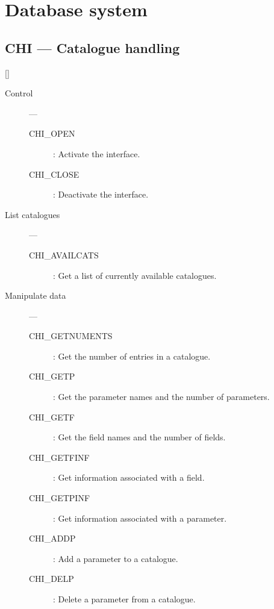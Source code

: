 \newpage

\section{Database system}

\subsection{CHI --- Catalogue handling}

\vspace{-9mm}

\hfill []

\vspace{2mm}

\begin{description}

\item [Control] ---

\begin{description}
\item [CHI\_OPEN] : Activate the interface.
\item [CHI\_CLOSE] : Deactivate the interface.
\end{description}
 
\item [List catalogues] ---

\begin{description}
\item [CHI\_AVAILCATS] :  Get a list of currently available catalogues.
\end{description}
 
\item [Manipulate data] ---

\begin{description}
\item [CHI\_GETNUMENTS] : Get the number of entries in a catalogue.
\item [CHI\_GETP] : Get the parameter names and the number of parameters.
\item [CHI\_GETF] : Get the field names and the number of fields.
\item [CHI\_GETFINF] : Get information associated with a field.
\item [CHI\_GETPINF] : Get information associated with a parameter.
\item [CHI\_ADDP] : Add a parameter to a catalogue.
\item [CHI\_DELP] : Delete a parameter from a catalogue.
\end{description}
 

\end{description}
